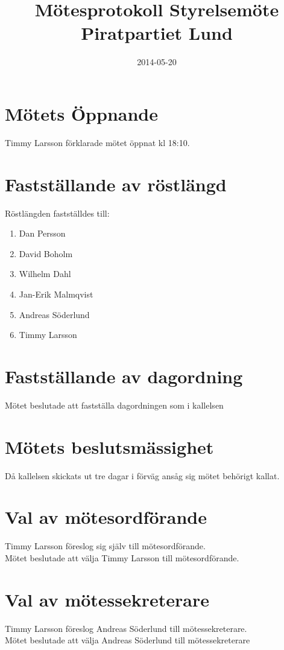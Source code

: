 \documentclass[a4paper,10pt]{article}
\title{\vspace{-1.5in}\textmd{\textbf{Mötesprotokoll Styrelsemöte Piratpartiet Lund}}}
\date{2014-05-20}
\author{}
\begin{document}
\maketitle

\section{Mötets Öppnande}
Timmy Larsson förklarade mötet öppnat kl 18:10.

\section{Fastställande av röstlängd}
Röstlängden fastställdes till:
\begin{enumerate}
\item Dan Persson
\item David Boholm
\item Wilhelm Dahl
\item Jan-Erik Malmqvist
\item Andreas Söderlund
\item Timmy Larsson
\end{enumerate}

\section{Fastställande av dagordning}
Mötet beslutade att fastställa dagordningen som i kallelsen

\section{Mötets beslutsmässighet}
Då kallelsen skickats ut tre dagar i förväg ansåg sig mötet behörigt kallat.

\newpage

\section{Val av mötesordförande}
Timmy Larsson föreslog sig själv till mötesordförande.\\
Mötet beslutade att välja Timmy Larsson till mötesordförande.

\section{Val av mötessekreterare}
Timmy Larsson föreslog Andreas Söderlund till mötessekreterare.\\
Mötet beslutade att välja Andreas Söderlund till mötessekreterare
\end{document}
